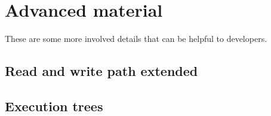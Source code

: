 \documentclass[11pt]{article}
\begin{document}

\hypertarget{advanced-material}{%
\section{Advanced material}\label{advanced-material}}

These are some more involved details that can be helpful to developers.

\hypertarget{read-and-write-path-extended}{%
\subsection{Read and write path
extended}\label{read-and-write-path-extended}}



\hypertarget{execution-trees}{%
\subsection{Execution trees}\label{execution-trees}}



\end{document}
